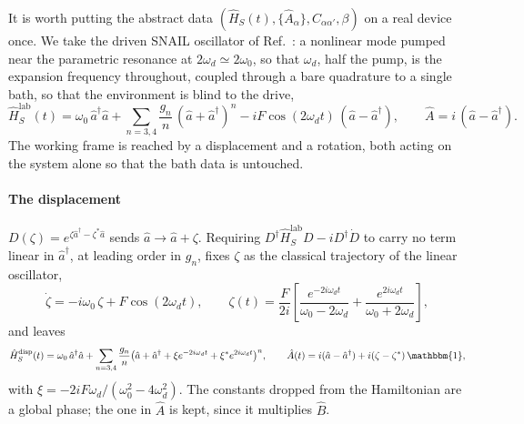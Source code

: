 \documentclass[a4paper,11pt]{article}
\newcommand{\id}{\mathbbm{1}}
\begin{document}
\begin{example}
It is worth putting the abstract data $(\hat H_S(t),\{\hat A_\alpha\},C_{\alpha\alpha'},\beta)$ on a real device once. We take the driven SNAIL oscillator of Ref.~\cite{Venkatraman2024Nonlinear}: a nonlinear mode pumped near the parametric resonance at $2\omega_d\simeq2\omega_0$, so that $\omega_d$, half the pump, is the expansion frequency throughout, coupled through a bare quadrature to a single bath, so that the environment is blind to the drive,
\begin{equation}\label{eq:kpo-lab}
  \hat H_S^{\mathrm{lab}}(t) = \omega_0\,\hat a^\dagger\hat a
  + \sum_{n=3,4}\frac{g_n}{n}\,(\hat a+\hat a^\dagger)^n
  - iF\cos(2\omega_d t)\,(\hat a - \hat a^\dagger),
  \qquad
  \hat A = i\,(\hat a - \hat a^\dagger).
\end{equation}
The working frame is reached by a displacement and a rotation, both acting on the system alone so that the bath data is untouched.

\paragraph{The displacement}
$D(\zeta) = e^{\zeta\hat a^\dagger - \zeta^*\hat a}$ sends $\hat a\to\hat a+\zeta$. Requiring $D^\dagger\hat H_S^{\mathrm{lab}}D - iD^\dagger\dot D$ to carry no term linear in $\hat a^\dagger$, at leading order in $g_n$, fixes $\zeta$ as the classical trajectory of the linear oscillator,
\begin{equation}\label{eq:kpo-zeta}
  \dot\zeta = -i\omega_0\,\zeta + F\cos(2\omega_d t),
  \qquad
  \zeta(t) = \frac{F}{2i}\left[\frac{e^{-2i\omega_d t}}{\omega_0-2\omega_d}
  + \frac{e^{2i\omega_d t}}{\omega_0+2\omega_d}\right],
\end{equation}
and leaves
\begin{equation}\label{eq:kpo-disp}
  \hat H_S^{\mathrm{disp}}(t) = \omega_0\,\hat a^\dagger\hat a
  + \sum_{n=3,4}\frac{g_n}{n}\big(\hat a+\hat a^\dagger+\xi e^{-2i\omega_d t}+\xi^* e^{2i\omega_d t}\big)^n,
  \qquad
  \hat A(t) = i(\hat a-\hat a^\dagger) + i(\zeta-\zeta^*)\,\id,
\end{equation}
with $\xi = -2iF\omega_d/(\omega_0^2-4\omega_d^2)$. The constants dropped from the Hamiltonian are a global phase; the one in $\hat A$ is kept, since it multiplies $\hat B$.


\end{example}
\end{document}
